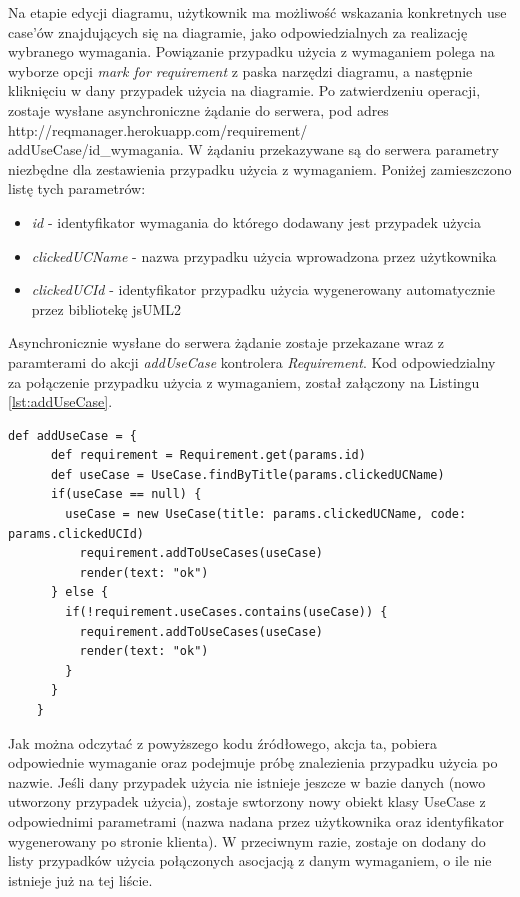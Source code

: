       Na etapie edycji diagramu, użytkownik ma możliwość wskazania konkretnych use case'ów znajdujących się na diagramie, jako odpowiedzialnych za realizację wybranego wymagania. Powiązanie przypadku użycia z wymaganiem polega na wyborze opcji \emph{mark for requirement} z paska narzędzi diagramu, a następnie kliknięciu w dany przypadek użycia na diagramie. Po zatwierdzeniu operacji, zostaje wysłane asynchroniczne żądanie do serwera, pod adres http://reqmanager.herokuapp.com/requirement/\\addUseCase/id\_wymagania. W żądaniu przekazywane są do serwera parametry niezbędne dla zestawienia przypadku użycia z wymaganiem. Poniżej zamieszczono listę tych parametrów:

    \begin{itemize}
      \item \emph{id} - identyfikator wymagania do którego dodawany jest przypadek użycia
      \item \emph{clickedUCName} - nazwa przypadku użycia wprowadzona przez użytkownika
      \item \emph{clickedUCId} - identyfikator przypadku użycia wygenerowany automatycznie przez bibliotekę jsUML2
    \end{itemize}

    Asynchronicznie wysłane do serwera żądanie zostaje przekazane wraz z paramterami do akcji \emph{addUseCase} kontrolera \emph{Requirement}. Kod odpowiedzialny za połączenie przypadku użycia z wymaganiem, został załączony na Listingu \ref{lst:addUseCase}.

    \begin{lstlisting}[caption={Kod łączący przypadek użycia z wymaganiem}, label={lst:addUseCase}]
    def addUseCase = {
      def requirement = Requirement.get(params.id)
      def useCase = UseCase.findByTitle(params.clickedUCName)
      if(useCase == null) {
        useCase = new UseCase(title: params.clickedUCName, code: params.clickedUCId)
          requirement.addToUseCases(useCase)
          render(text: "ok")
      } else {
        if(!requirement.useCases.contains(useCase)) {
          requirement.addToUseCases(useCase)
          render(text: "ok")
        } 
      }
    }
    \end{lstlisting}

    Jak można odczytać z powyższego kodu źródłowego, akcja ta, pobiera odpowiednie wymaganie oraz podejmuje próbę znalezienia przypadku użycia po nazwie. Jeśli dany przypadek użycia nie istnieje jeszcze w bazie danych (nowo utworzony przypadek użycia), zostaje swtorzony nowy obiekt klasy UseCase z odpowiednimi parametrami (nazwa nadana przez użytkownika oraz identyfikator wygenerowany po stronie klienta). W przeciwnym razie, zostaje on dodany do listy przypadków użycia połączonych asocjacją z danym wymaganiem, o ile nie istnieje już na tej liście. 

